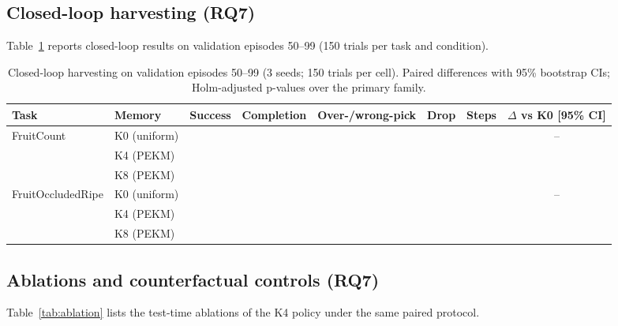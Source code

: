 \subsection{Closed-loop harvesting (RQ7)}
\label{sec:res_closed}
Table~\ref{tab:closed} reports closed-loop results on validation episodes 50--99 (150 trials per task and condition). 

\begin{table}[t]
\centering
\caption{Closed-loop harvesting on validation episodes 50--99 (3 seeds; 150 trials per cell). Paired differences with 95\% bootstrap CIs; Holm-adjusted p-values over the primary family.}
\label{tab:closed}
\footnotesize
\begin{adjustbox}{max width=\textwidth}\begin{tabular}{llcccccc}
\toprule
Task & Memory & Success & Completion & Over-/wrong-pick & Drop & Steps & $\Delta$ vs K0 [95\% CI]\\
\midrule
FruitCount & K0 (uniform) & \tbd{} & \tbd{} & \tbd{} & \tbd{} & \tbd{} & --\\
 & K4 (PEKM) & \tbd{} & \tbd{} & \tbd{} & \tbd{} & \tbd{} & \tbd{}\\
 & K8 (PEKM) & \tbd{} & \tbd{} & \tbd{} & \tbd{} & \tbd{} & \tbd{}\\
FruitOccludedRipe & K0 (uniform) & \tbd{} & \tbd{} & \tbd{} & \tbd{} & \tbd{} & --\\
 & K4 (PEKM) & \tbd{} & \tbd{} & \tbd{} & \tbd{} & \tbd{} & \tbd{}\\
 & K8 (PEKM) & \tbd{} & \tbd{} & \tbd{} & \tbd{} & \tbd{} & \tbd{}\\
\bottomrule
\end{tabular}\end{adjustbox}
\end{table}

\subsection{Ablations and counterfactual controls (RQ7)}
\label{sec:res_ablation}
Table~\ref{tab:ablation} lists the test-time ablations of the K4 policy under the same paired protocol. 

